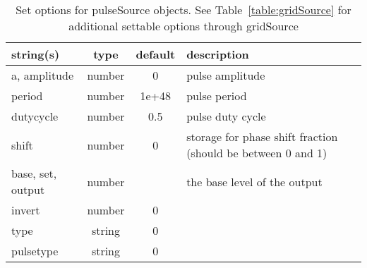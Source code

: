 \begin{table}[ht]
\centering
\begin{tabular}{p{5cm} c c p{7cm}}
\hline
string(s) & type & default & description \\
\hline
a, amplitude & number & 0 & pulse amplitude\\
period & number & 1e+48 & pulse period\\
dutycycle & number & 0.5 & pulse duty cycle\\
shift & number & 0 & storage for phase shift fraction (should be between 0 and 1)\\
base, set, output & number &  & the base level of the output\\
invert & number & 0 & \\
type & string & 0 & \\
pulsetype & string & 0 & \\
\hline
\end{tabular}
\caption{Set options for pulseSource objects. See Table~\ref{table:gridSource} for additional settable options through gridSource}
\label{table:pulseSource}
\end{table}
